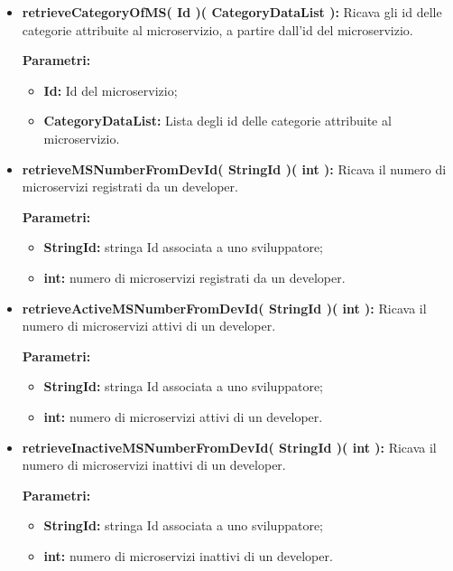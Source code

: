 \begin{itemize}
\begin{itemize}
			\item \textbf{retrieveCategoryOfMS( Id )( CategoryDataList ):} Ricava gli id delle categorie attribuite al microservizio, a partire dall'id del microservizio.
				\begin{description}
    				\item[\textbf{Parametri:}]
				\end{description}
				\begin{itemize}
					\item \textbf{Id:} Id del microservizio;
					\item \textbf{CategoryDataList:} Lista degli id delle categorie attribuite al microservizio.
				\end{itemize}
				
			\item \textbf{retrieveMSNumberFromDevId( StringId )( int ):} Ricava il numero di microservizi registrati da un developer.
			\begin{description}
				\item[\textbf{Parametri:}]
			\end{description}
			\begin{itemize}
				\item \textbf{StringId:} stringa Id associata a uno sviluppatore;
				\item \textbf{int:} numero di microservizi registrati da un developer.
			\end{itemize}	
		
			\item \textbf{retrieveActiveMSNumberFromDevId( StringId )( int ):} Ricava il numero di microservizi attivi di un developer.
			\begin{description}
				\item[\textbf{Parametri:}]
			\end{description}
			\begin{itemize}
				\item \textbf{StringId:} stringa Id associata a uno sviluppatore;
				\item \textbf{int:} numero di microservizi attivi di un developer.
			\end{itemize}
		
			\item \textbf{retrieveInactiveMSNumberFromDevId( StringId )( int ):} Ricava il numero di microservizi inattivi di un developer.
			\begin{description}
				\item[\textbf{Parametri:}]
			\end{description}
			\begin{itemize}
				\item \textbf{StringId:} stringa Id associata a uno sviluppatore;
				\item \textbf{int:} numero di microservizi inattivi di un developer.
			\end{itemize}	
			

\end{itemize}
\end{itemize}

